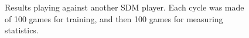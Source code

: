 \begin{figure}[!htb]
\centering
{}


\caption{Results playing against another SDM player. Each cycle was made of 100 games for training, and then 100 games for measuring statistics.
\label{fig:ttt-results-sdm}
}
\end{figure}

